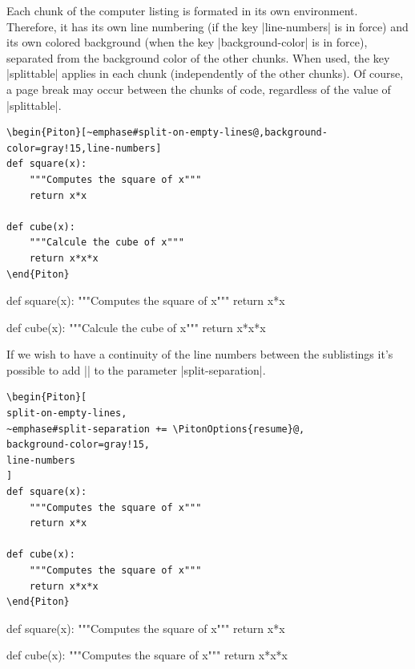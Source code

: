 \documentclass{article}
\begin{document}
Each chunk of the computer listing is formated in its own environment.
Therefore, it has its own line numbering (if the key
|line-numbers| is in force) and its own colored background (when the key
|background-color| is in force), separated from the background color of the
other chunks. When used, the key |splittable| applies in each chunk
(independently of the other chunks). Of course, a page break may occur between
the chunks of code, regardless of the value of |splittable|.

\bigskip
\begin{Verbatim}
\begin{Piton}[~emphase#split-on-empty-lines@,background-color=gray!15,line-numbers]
def square(x):
    """Computes the square of x"""
    return x*x

def cube(x):
    """Calcule the cube of x"""
    return x*x*x
\end{Piton}
\end{Verbatim}


\begin{Piton}[split-on-empty-lines,background-color=gray!15,line-numbers]
def square(x):
    """Computes the square of x"""
    return x*x

def cube(x):
    """Calcule the cube of x"""
    return x*x*x
\end{Piton}


\bigskip
If we wish to have a continuity of the line numbers between the sublistings
it's possible to add || to the parameter |split-separation|.

\begin{Verbatim}
\begin{Piton}[
split-on-empty-lines,
~emphase#split-separation += \PitonOptions{resume}@,
background-color=gray!15,
line-numbers
]
def square(x):
    """Computes the square of x"""
    return x*x

def cube(x):
    """Computes the square of x"""
    return x*x*x
\end{Piton}
\end{Verbatim}

\begin{Piton}[
   split-on-empty-lines,
   split-separation += \PitonOptions{resume} ,
   background-color = gray!15,
   line-numbers
 ]
def square(x):
    """Computes the square of x"""
    return x*x

def cube(x):
    """Computes the square of x"""
    return x*x*x
\end{Piton}
\end{document}
